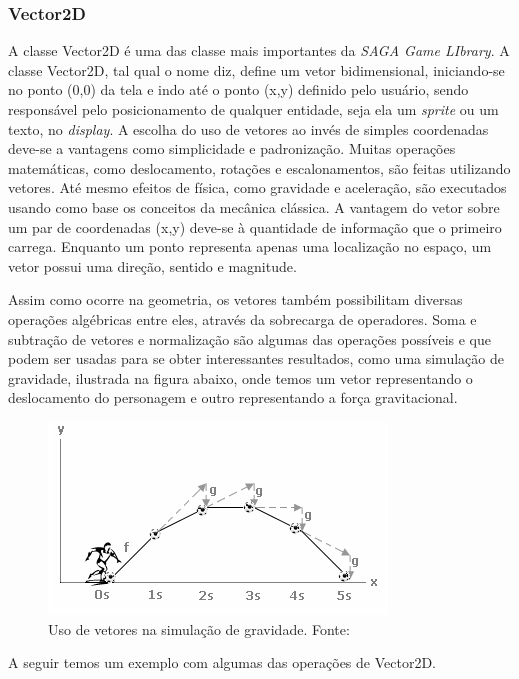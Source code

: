 \subsubsection{Vector2D}
%
%
A classe Vector2D é uma das classe mais importantes da \textit{SAGA Game LIbrary}. A classe Vector2D, tal qual o nome diz, define um vetor bidimensional, iniciando-se no ponto (0,0) da tela e indo até o ponto (x,y) definido pelo usuário, sendo responsável pelo posicionamento de qualquer entidade, seja ela um \textit{sprite} ou um texto, no \textit{display}. A escolha do uso de vetores ao invés de simples coordenadas deve-se a vantagens como simplicidade e padronização. Muitas operações matemáticas, como deslocamento, rotações e escalonamentos, são feitas utilizando vetores. Até mesmo efeitos de física, como gravidade e aceleração, são executados usando como base os conceitos da mecânica clássica. A vantagem do vetor sobre um par de coordenadas (x,y) deve-se à quantidade de informação que o primeiro carrega. Enquanto um ponto representa apenas uma localização no espaço, um vetor possui uma direção, sentido e magnitude. 
\par 
Assim como ocorre na geometria, os vetores também possibilitam diversas operações algébricas entre eles, através da sobrecarga de operadores. Soma e subtração de vetores e normalização são algumas das operações possíveis e que podem ser usadas para se obter interessantes resultados, como uma simulação de gravidade, ilustrada na figura abaixo, onde temos um vetor representando o deslocamento do personagem e outro representando a força gravitacional.
%
%
%
\begin{figure}[H]
    \centering
		\caption{Uso de vetores na simulação de gravidade. Fonte: \cite{PontoV}}
    \label{VetorGravidade}
    \includegraphics[scale = 0.8]{Imagens/VetorGravidade.png}
\end{figure}
%
%
A seguir temos um exemplo com algumas das operações de Vector2D.
%

%
%
